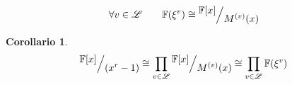 \documentclass[mathserif]{beamer}
\def\quotient#1#2{%
   \raise1ex\hbox{$#1$}\Big/\lower1ex\hbox{$#2$}%
}
\newtheorem{corollario}{Corollario}
\begin{document}
\begin{frame}
   \begin{lemma}
   \begin{align*}
      \forall v \in \mathscr{L}
      \qquad
      \mathbb{F}(\xi^{v})
      \cong
      \quotient{\mathbb{F} \lbrack x \rbrack  }{M^{(v)}(x)}
   \end{align*}
  \end{lemma}
  \begin{corollario}
     \begin{align*}
        \quotient{\mathbb{F} \lbrack x \rbrack  }{ (x^{r} - 1)} 
         \cong 
         \prod_{v\in \mathscr{L}} \quotient{\mathbb{F} \lbrack x \rbrack  }{M^{(v)}(x)}  
         \cong 
         \prod_{v\in \mathscr{L}} \mathbb{F}(\xi^{v})
     \end{align*}   
  \end{corollario}
   
\end{frame}


\end{document}
